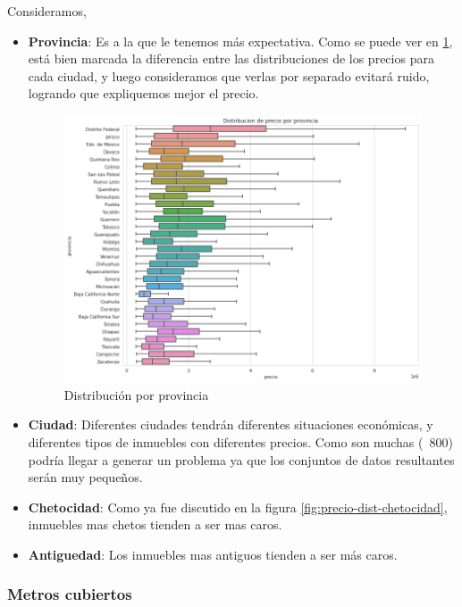     Consideramos,
    
    \begin{itemize}
        \item \textbf{Provincia}: Es a la que le tenemos más expectativa. Como se puede ver en \ref{fig:precio-dist-provincia}, está bien marcada la diferencia entre las distribuciones de los precios para cada ciudad, y luego consideramos que verlas por separado evitará ruido, logrando que expliquemos mejor el precio.
        
            \begin{figure}[H]
                \centering
                \includegraphics[scale=0.45]{img/cmp/precio/dist-provincia.png}
                \caption{Distribución por provincia}
                \label{fig:precio-dist-provincia}
            \end{figure}
        
        \item \textbf{Ciudad}: Diferentes ciudades tendrán diferentes situaciones económicas, y diferentes tipos de inmuebles con diferentes precios. Como son muchas (~800) podría llegar a generar un problema ya que los conjuntos de datos resultantes serán muy pequeños.
        \item \textbf{Chetocidad}: Como ya fue discutido en la figura \ref{fig:precio-dist-chetocidad}, inmuebles mas chetos tienden a ser mas caros.
        \item \textbf{Antiguedad}: Los inmuebles mas antiguos tienden a ser más caros.
    \end{itemize}
    
    \subsubsection{Metros cubiertos}
    
